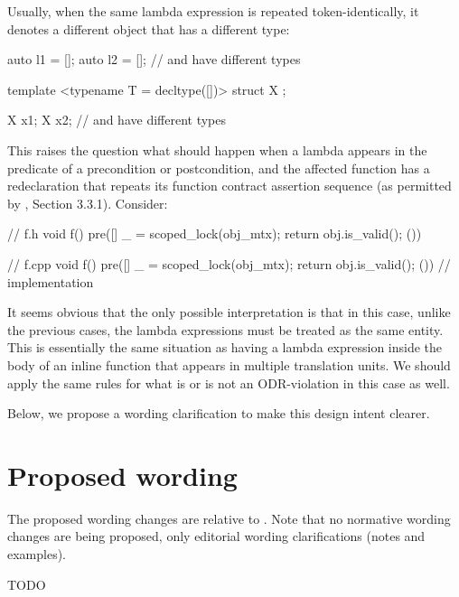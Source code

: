 Usually, when the same lambda expression is repeated token-identically, it denotes a different object that has a different type:
\begin{codeblock}
auto l1 = []{};  
auto l2 = []{};
//  and  have different types

template <typename T = decltype([]{})>
struct X {};

X x1;
X x2;
//  and  have different types
\end{codeblock}
This raises the question what should happen when a lambda appears in the predicate of a precondition or postcondition, and the affected function has a redeclaration that repeats its function contract assertion sequence (as permitted by \cite{P2900R10}, Section 3.3.1). Consider:
\begin{codeblock}
// f.h
void f() pre([]{ _ = scoped_lock(obj_mtx); return obj.is_valid(); }())

// f.cpp  
void f() pre([]{ _ = scoped_lock(obj_mtx); return obj.is_valid(); }()) {
  // implementation
}
\end{codeblock}
It seems obvious that the only possible interpretation is that in this case, unlike the previous cases, the lambda expressions must be treated as the same entity. This is essentially the same situation as having a lambda expression inside the body of an inline function that appears in multiple translation units. We should apply the same rules for what is or is not an ODR-violation in this case as well.

Below, we propose a wording clarification to make this design intent clearer.

\section{Proposed wording}

The proposed wording changes are relative to \cite{P2900R10}. Note that no normative wording changes are being proposed, only editorial wording clarifications (notes and examples).

TODO


\renewcommand{\addcontentsline}[3]{}%








